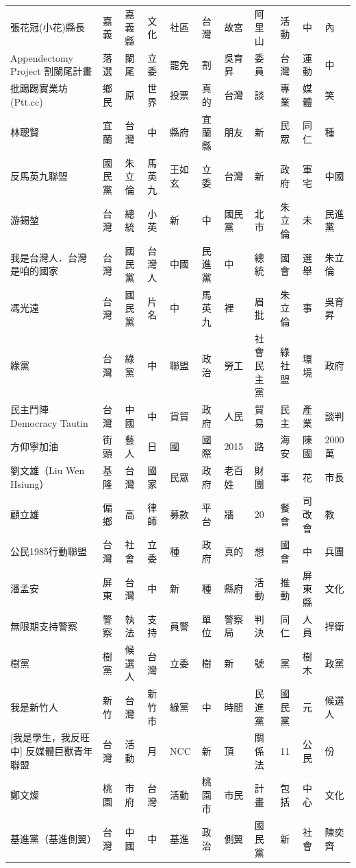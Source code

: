 \documentclass[letterpaper, 10pt, conference]{ieeeconf}   %
\begin{document}
\begin{CJK}{UTF8}{bsmi}
\begin{longtable}[c]{@{}L{2.45cm}L{1.1cm}L{1.1cm}L{1.1cm}L{1.1cm}L{1.1cm}L{1.1cm}L{1.1cm}L{1.1cm}L{1.1cm}L{1.1cm}@{}}
張花冠(小花)縣長 & 嘉義 & 嘉義縣 & 文化 & 社區 & 台灣 & 故宮 & 阿里山 & 活動 & 中 & 內 \\
Appendectomy Project 割闌尾計畫 & 落選 & 闌尾 & 立委 & 罷免 & 割 & 吳育昇 & 委員 & 台灣 & 運動 & 中 \\
批踢踢實業坊(Ptt.cc) & 鄉民 & 原 & 世界 & 投票 & 真的 & 台灣 & 談 & 專業 & 媒體 & 笑 \\
林聰賢 & 宜蘭 & 台灣 & 中 & 縣府 & 宜蘭縣 & 朋友 & 新 & 民眾 & 同仁 & 種 \\
反馬英九聯盟 & 國民黨 & 朱立倫 & 馬英九 & 王如玄 & 立委 & 台灣 & 新 & 政府 & 軍宅 & 中國 \\
游錫堃 & 台灣 & 總統 & 小英 & 新 & 中 & 國民黨 & 北市 & 朱立倫 & 未 & 民進黨 \\
我是台灣人．台灣是咱的國家 & 台灣 & 國民黨 & 台灣人 & 中國 & 民進黨 & 中 & 總統 & 國會 & 選舉 & 朱立倫 \\
馮光遠 & 台灣 & 國民黨 & 片名 & 中 & 馬英九 & 裡 & 眉批 & 朱立倫 & 事 & 吳育昇 \\
綠黨 & 台灣 & 綠黨 & 中 & 聯盟 & 政治 & 勞工 & 社會民主黨 & 綠社盟 & 環境 & 政府 \\
民主鬥陣 Democracy Tautin & 台灣 & 中國 & 中 & 貨貿 & 政府 & 人民 & 貿易 & 民主 & 產業 & 談判 \\
方仰寧加油 & 街頭 & 藝人 & 日 & 國 & 國際 & 2015 & 路 & 海安 & 陳國 & 2000萬 \\
劉文雄（Liu Wen Hsiung） & 基隆 & 台灣 & 國家 & 民眾 & 政府 & 老百姓 & 財團 & 事 & 花 & 市長 \\
顧立雄 & 偏鄉 & 高 & 律師 & 募款 & 平台 & 牆 & 20 & 餐會 & 司改會 & 教 \\
公民1985行動聯盟 & 台灣 & 社會 & 立委 & 種 & 政府 & 真的 & 想 & 國會 & 中 & 兵團 \\
潘孟安 & 屏東 & 台灣 & 中 & 新 & 種 & 縣府 & 活動 & 推動 & 屏東縣 & 文化 \\
無限期支持警察 & 警察 & 執法 & 支持 & 員警 & 單位 & 警察局 & 判決 & 同仁 & 人員 & 捍衛 \\
樹黨 & 樹黨 & 候選人 & 台灣 & 立委 & 樹 & 新 & 號 & 黨 & 樹木 & 政黨 \\
我是新竹人 & 新竹 & 台灣 & 新竹市 & 綠黨 & 中 & 時間 & 民進黨 & 國民黨 & 元 & 候選人 \\
{[}我是學生，我反旺中{]} 反媒體巨獸青年聯盟 & 台灣 & 活動 & 月 & NCC & 新 & 頂 & 關係法 & 11 & 公民 & 份 \\
鄭文燦 & 桃園 & 市府 & 台灣 & 活動 & 桃園市 & 市民 & 計畫 & 包括 & 中心 & 文化 \\
基進黨（基進側翼） & 台灣 & 中國 & 中 & 基進 & 政治 & 側翼 & 國民黨 & 新 & 社會 & 陳奕齊 \\

\end{longtable}
\end{CJK}
\end{document}
